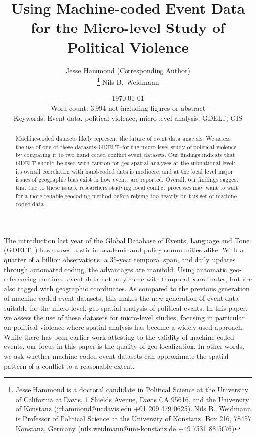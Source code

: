 \documentclass[hidelinks]{article}
\begin{document}
\title{Using Machine-coded Event Data for the Micro-level Study of Political Violence}
\author{Jesse Hammond (Corresponding Author) \\
\let\thefootnote\relax\footnote{Jesse Hammond is a doctoral candidate in Political Science at the University of California at Davis, 1 Shields Avenue, Davis CA 95616, and the University of Konstanz (jrhammond@ucdavis.edu +01 209 479 0625). Nils B.~Weidmann is Professor of Political Science at the University of Konstanz, Box 216, 78457 Konstanz, Germany (nils.weidmann@uni-konstanz.de +49 7531 88 5676)}
Nils B.~Weidmann}
\date{\today\\[5mm]Word count: 3,994 not including figures or abstract\\[5mm]
Keywords: Event data, political violence, micro-level analysis, GDELT, GIS}

\maketitle


\begin{abstract}\textsl{}
Machine-coded datasets likely represent the future of event data analysis. We assess the use of one of these datasets--GDELT--for the micro-level study of political violence by comparing it to two hand-coded conflict event datasets. Our findings indicate that GDELT should be used with caution for geo-spatial analyses at the subnational level: its overall correlation with hand-coded data is mediocre, and at the local level major issues of geographic bias exist in how events are reported. Overall, our findings suggest that due to these issues, researchers studying local conflict processes may want to wait for a more reliable geocoding method before relying too heavily on this set of machine-coded data.
\end{abstract}

\doublespacing 

The introduction last year of the Global Database of Events, Language and Tone (GDELT, \citealt{leetaru13gdelt}) has caused a stir in academic and policy communities alike. With a quarter of a billion observations, a 35-year temporal span, and daily updates through automated coding, the advantages are manifold. Using automatic geo-referencing routines, event data not only come with temporal coordinates, but are also tagged with geographic coordinates. As compared to the previous generation of machine-coded event datasets, this makes the new generation of event data suitable for the micro-level, geo-spatial analysis of political events. In this paper, we assess the use of these datasets for micro-level studies, focusing in particular on political violence where spatial analysis has become a widely-used approach. While there has been earlier work attesting to the validity of machine-coded events, our focus in this paper is the quality of geo-localization. In other words, we ask whether machine-coded event datasets can approximate the spatial pattern of a conflict to a reasonable extent.  
\end{document}
